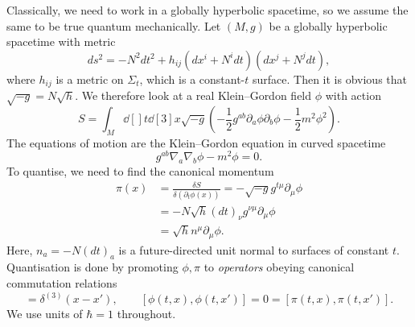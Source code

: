 Classically, we need to work in a globally hyperbolic spacetime, so we assume the same to be true quantum mechanically.
Let $(M, g)$ be a globally hyperbolic spacetime with metric
\begin{equation}
  ds^2 = -N^2 dt^2 + h_{ij} (dx^{i}  +N^{i} dt) (dx^{j} + N^{j} dt),
\end{equation}
where $h_{ij}$ is a metric on $\Sigma_t$, which is a constant-$t$ surface.
Then it is obvious that $\sqrt{-g} = N \sqrt{h}$.
We therefore look at a real Klein--Gordon field $\phi$ with action
\begin{equation}
  S = \int_M \dd[]{t} \dd[3]{x} \sqrt{-g} \left( -\frac{1}{2} g^{ab} \partial_{a} \phi \partial_{b} \phi - \frac{1}{2} m^2 \phi^2 \right).
\end{equation}
The equations of motion are the Klein--Gordon equation in curved spacetime
\begin{equation}
  g^{ab} \nabla_a \nabla_b \phi - m^2 \phi = 0.
\end{equation}
To quantise, we need to find the canonical momentum
\begin{align}
  \pi(x) &= \frac{\delta S}{\delta (\partial_t \phi(x))} = - \sqrt{-g} g^{t \mu} \partial_{\mu} \phi \\
	 &= - N \sqrt{h} (dt)_\nu g^{\nu\mu} \partial_{\mu} \phi \\
	 &= \sqrt{h} n^{\mu} \partial_{\mu} \phi.
\end{align}
Here, $n_{a} = -N (dt)_a$ is a future-directed unit normal to surfaces of constant $t$.
Quantisation is done by promoting $\phi, \pi$ to \emph{operators} obeying canonical commutation relations
\begin{equation}
  [\phi(t, x), \pi(t, x')] = \delta^{(3)} (x - x'), \qquad [\phi(t, x), \phi(t, x')] = 0 = [\pi(t, x), \pi(t, x')].
\end{equation}
We use units of $\hbar = 1$ throughout.
